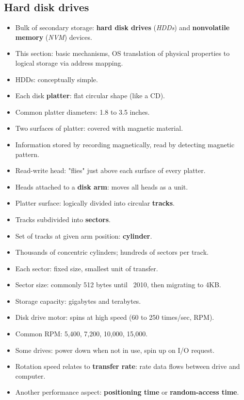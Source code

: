 \subsection{Hard disk drives}
\begin{itemize}
    \item Bulk of secondary storage: \textbf{hard disk drives} (\textit{HDDs}) and \textbf{nonvolatile memory} (\textit{NVM}) devices.
    \item This section: basic mechanisms, OS translation of physical properties to logical storage via address mapping.
    \item HDDs: conceptually simple.
    \item Each disk \textbf{platter}: flat circular shape (like a CD).
    \item Common platter diameters: 1.8 to 3.5 inches.
    \item Two surfaces of platter: covered with magnetic material.
    \item Information stored by recording magnetically, read by detecting magnetic pattern.
    \item Read-write head: "flies" just above each surface of every platter.
    \item Heads attached to a \textbf{disk arm}: moves all heads as a unit.
    \item Platter surface: logically divided into circular \textbf{tracks}.
    \item Tracks subdivided into \textbf{sectors}.
    \item Set of tracks at given arm position: \textbf{cylinder}.
    \item Thousands of concentric cylinders; hundreds of sectors per track.
    \item Each sector: fixed size, smallest unit of transfer.
    \item Sector size: commonly 512 bytes until ~2010, then migrating to 4KB.
    \item Storage capacity: gigabytes and terabytes.
    \item Disk drive motor: spins at high speed (60 to 250 times/sec, RPM).
    \item Common RPM: 5,400, 7,200, 10,000, 15,000.
    \item Some drives: power down when not in use, spin up on I/O request.
    \item Rotation speed relates to \textbf{transfer rate}: rate data flows between drive and computer.
    \item Another performance aspect: \textbf{positioning time} or \textbf{random-access time}.

\end{itemize}

